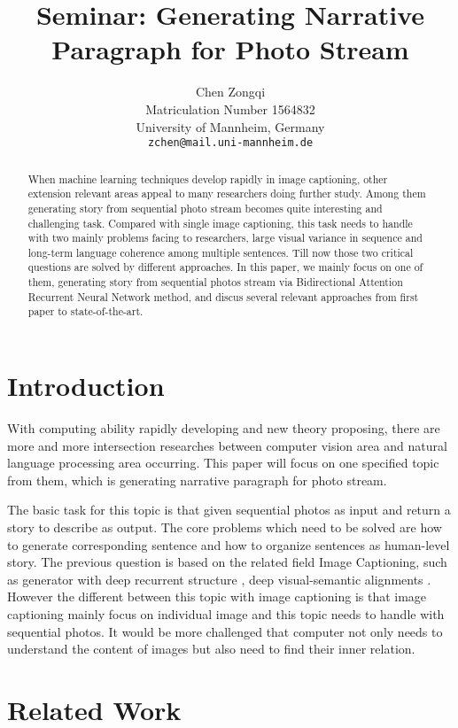 \documentclass[11pt]{article}
\title{Seminar: Generating Narrative Paragraph for Photo Stream }
\author{Chen Zongqi\\
	    Matriculation Number 1564832\\
	    University of Mannheim, Germany\\
	    {\tt zchen@mail.uni-mannheim.de}}
\date{}
\begin{document}
\maketitle

\begin{abstract}
When machine learning techniques develop rapidly in image captioning, other extension relevant areas appeal to many researchers doing further study. Among them generating story from sequential photo stream becomes quite interesting and challenging task. Compared with single image captioning, this task needs to handle with two mainly problems facing to researchers, large visual variance in sequence and long-term language coherence among multiple sentences. Till now those two critical questions are solved by different approaches. In this paper, we mainly focus on one of them, generating story from sequential photos stream via Bidirectional Attention Recurrent Neural Network method, and discus several relevant approaches from first paper to state-of-the-art.   
\end{abstract}

\section{Introduction}
With computing ability rapidly developing and new theory proposing, there are more and more intersection researches between computer vision area and natural language processing area occurring. This paper will focus on one specified topic from them, which is generating narrative paragraph for photo stream.  	

The basic task for this topic is that given sequential photos as input and return a story to describe as output. The core problems which need to be solved are how to generate corresponding sentence and how to organize sentences as human-level story. The previous question is based on the related field Image Captioning, such as generator with deep recurrent structure \cite{vinyals2014neural}, deep visual-semantic alignments  \cite{Karpathy:2017:DVA:3069214.3069250}. However the different between this topic with image captioning is that image captioning mainly focus on individual image and this topic needs to handle with sequential photos. It would be more challenged that computer not only needs to understand the content of images but also need to find their inner relation.   


\section{Related Work}
	
\end{document}
